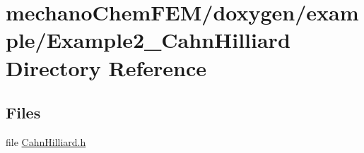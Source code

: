 \section{mechano\-Chem\-F\-E\-M/doxygen/example/\-Example2\-\_\-\-Cahn\-Hilliard Directory Reference}
\label{dir_2282f6451eb4d368a47aa60ae08e65e0}
\subsection*{Files}
\begin{DoxyCompactItemize}
\item 
file \hyperlink{_cahn_hilliard_8h}{Cahn\-Hilliard.\-h}
\end{DoxyCompactItemize}
